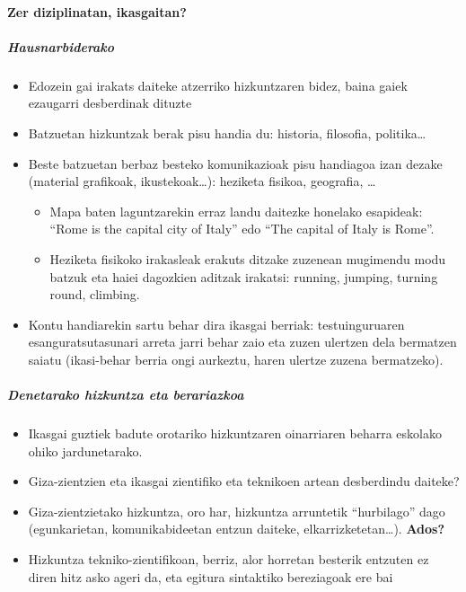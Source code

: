 \documentclass[
]{book}
\providecommand{\tightlist}{%
  \setlength{\itemsep}{0pt}\setlength{\parskip}{0pt}}
\begin{document}
\hypertarget{zer-diziplinatan-ikasgaitan}{%
\paragraph{Zer diziplinatan, ikasgaitan?}\label{zer-diziplinatan-ikasgaitan}}

\hypertarget{hausnarbiderako}{%
\subparagraph{Hausnarbiderako}\label{hausnarbiderako}}

\begin{itemize}
\tightlist
\item
  Edozein gai irakats daiteke atzerriko hizkuntzaren bidez, baina gaiek ezaugarri desberdinak dituzte
\item
  Batzuetan hizkuntzak berak pisu handia du: historia, filosofia, politika\ldots{}
\item
  Beste batzuetan berbaz besteko komunikazioak pisu handiagoa izan dezake (material grafikoak, ikustekoak\ldots): heziketa fisikoa, geografia, \ldots{}

  \begin{itemize}
  \tightlist
  \item
    Mapa baten laguntzarekin erraz landu daitezke honelako esapideak: ``Rome is the capital city of Italy'' edo ``The capital of Italy is Rome''.
  \item
    Heziketa fisikoko irakasleak erakuts ditzake zuzenean mugimendu modu batzuk eta haiei dagozkien aditzak irakatsi: running, jumping, turning round, climbing.
  \end{itemize}
\item
  Kontu handiarekin sartu behar dira ikasgai berriak: testuinguruaren esanguratsutasunari arreta jarri behar zaio eta zuzen ulertzen dela bermatzen saiatu (ikasi-behar berria ongi aurkeztu, haren ulertze zuzena bermatzeko).
\end{itemize}

\hypertarget{denetarako-hizkuntza-eta-berariazkoa}{%
\subparagraph{Denetarako hizkuntza eta berariazkoa}\label{denetarako-hizkuntza-eta-berariazkoa}}

\begin{itemize}
\tightlist
\item
  Ikasgai guztiek badute orotariko hizkuntzaren oinarriaren beharra eskolako ohiko jardunetarako.
\item
  Giza-zientzien eta ikasgai zientifiko eta teknikoen artean desberdindu daiteke?
\item
  Giza-zientzietako hizkuntza, oro har, hizkuntza arruntetik ``hurbilago'' dago (egunkarietan, komunikabideetan entzun daiteke, elkarrizketetan\ldots). \textbf{Ados?}
\item
  Hizkuntza tekniko-zientifikoan, berriz, alor horretan besterik entzuten ez diren hitz asko ageri da, eta egitura sintaktiko bereziagoak ere bai
\end{itemize}
\end{document}
